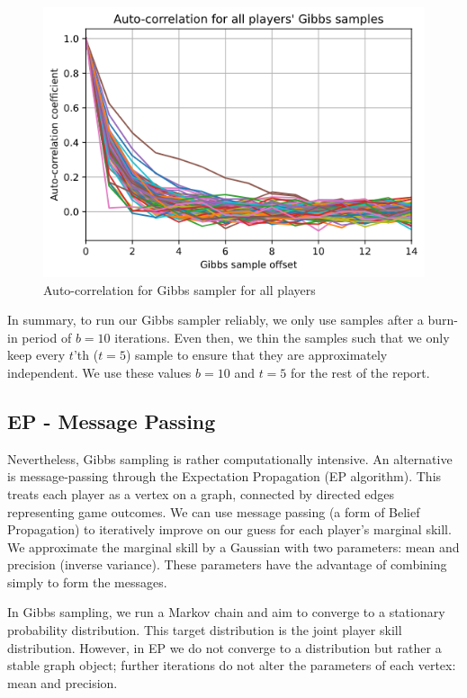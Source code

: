 \documentclass[]{article}
\newcommand{\figwidth}{0.6\linewidth}
\begin{document}
\begin{figure}[!h]
	\centering
	\includegraphics[width=\figwidth]{auto-cor.png}
	\caption{Auto-correlation for Gibbs sampler for all players}
	\label{fig:auto-cor}
\end{figure}

In summary, to run our Gibbs sampler reliably, we only use samples after a burn-in period of $b=10$ iterations. Even then, we thin the samples such that we only keep every $t$'th ($t=5$) sample to ensure that they are approximately independent. We use these values $b=10$ and $t=5$ for the rest of the report.

\subsection{EP - Message Passing}

Nevertheless, Gibbs sampling is rather computationally intensive. An alternative is message-passing through the Expectation Propagation (EP algorithm). This treats each player as a vertex on a graph, connected by directed edges representing game outcomes. We can use message passing (a form of Belief Propagation) to iteratively improve on our guess for each player's marginal skill. We approximate the marginal skill by a Gaussian with two parameters: mean and precision (inverse variance). These parameters have the advantage of combining simply to form the messages.

In Gibbs sampling, we run a Markov chain and aim to converge to a stationary probability distribution. This target distribution is the joint player skill distribution. However, in EP we do not converge to a distribution but rather a stable graph object; further iterations do not alter the parameters of each vertex: mean and precision.
\end{document}
